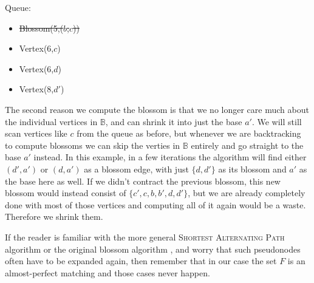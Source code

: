 \begin{minipage}{.7\linewidth}
\end{minipage}\hfill%
\begin{minipage}{.26\linewidth}
    \vspace{2cm}
    Queue:
    \begin{itemize}
        \item \st{Blossom(5,($b$,$c$))}
        \item Vertex(6,$c$)
        \item Vertex(6,$d$)
        \item Vertex(8,$d'$)
    \end{itemize}
\end{minipage}

The second reason we compute the blossom is that we no longer care much about the individual vertices in $\mathbb{B}$, and can shrink it into just the base $a'$. We will still scan vertices like $c$ from the queue as before, but whenever we are backtracking to compute blossoms we can skip the verties in $\mathbb{B}$ entirely and go straight to the base $a'$ instead. In this example, in a few iterations the algorithm will find either $(d',a')$ or $(d,a')$ as a blossom edge, with just $\{d,d'\}$ as its blossom and $a'$ as the base here as well. If we didn't contract the previous blossom, this new blossom would instead consist of $\{c',c,b,b',d,d'\}$, but we are already completely done with most of those vertices and computing all of it again would be a waste. Therefore we shrink them. 

If the reader is familiar with the more general \textsc{Shortest Alternating Path} algorithm \cite{source:shortest_alternating_path} or the original blossom algorithm \cite{source:blossom}, and worry that such pseudonodes often have to be expanded again, then remember that in our case the set $F$ is an almost-perfect matching and those cases never happen. 

